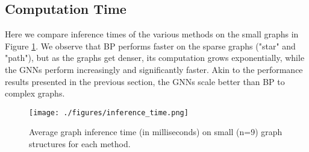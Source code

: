 \documentclass{article}
\newcommand{\anthony}[1]{\textcolor{green}{[Anthony : #1]}}
\begin{document}
\subsection{Computation Time}

Here we compare inference times of the various methods on the small graphs in Figure \ref{fig:inf_time}. We observe that BP performs faster on the sparse graphs ("star" and "path"), but as the graphs get denser, its computation grows exponentially, while the GNNs perform increasingly and significantly faster. Akin to the performance results presented in the previous section, the GNNs scale better than BP to complex graphs. 
\begin{figure}[ht]
    \centering
    \texttt{[image: ./figures/inference\_time.png]}
    \caption{Average graph inference time (in milliseconds) on small (n=9) graph structures for each method.}
    \label{fig:inf_time}
\end{figure}
    


\end{document}
